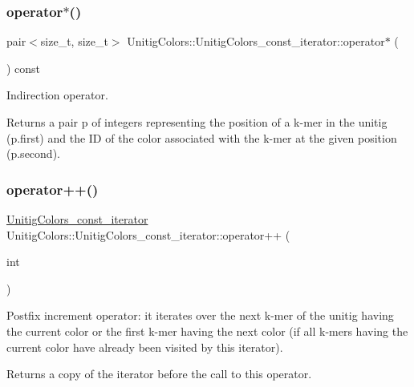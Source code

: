\subsubsection{\texorpdfstring{operator$\ast$()}{operator*()}}
{\footnotesize\ttfamily pair$<$size\+\_\+t, size\+\_\+t$>$ Unitig\+Colors\+::\+Unitig\+Colors\+\_\+const\+\_\+iterator\+::operator$\ast$ (\begin{DoxyParamCaption}{ }\end{DoxyParamCaption}) const\hspace{0.3cm}{\ttfamily [inline]}}



Indirection operator. 

\begin{DoxyReturn}{Returns}
a pair p of integers representing the position of a k-\/mer in the unitig (p.\+first) and the ID of the color associated with the k-\/mer at the given position (p.\+second). 
\end{DoxyReturn}
\mbox{\label{classUnitigColors_1_1UnitigColors__const__iterator_a8ab4940bd251e29329edb8e0e46483b4}} 
\subsubsection{\texorpdfstring{operator++()}{operator++()}\hspace{0.1cm}{\footnotesize\ttfamily [1/2]}}
{\footnotesize\ttfamily \hyperlink{classUnitigColors_1_1UnitigColors__const__iterator}{Unitig\+Colors\+\_\+const\+\_\+iterator} Unitig\+Colors\+::\+Unitig\+Colors\+\_\+const\+\_\+iterator\+::operator++ (\begin{DoxyParamCaption}\item[{int}]{ }\end{DoxyParamCaption})}



Postfix increment operator\+: it iterates over the next k-\/mer of the unitig having the current color or the first k-\/mer having the next color (if all k-\/mers having the current color have already been visited by this iterator). 

\begin{DoxyReturn}{Returns}
a copy of the iterator before the call to this operator. 
\end{DoxyReturn}
\mbox{\label{classUnitigColors_1_1UnitigColors__const__iterator_acf6c4cff3345fa23053dbd9be046974f}} 
